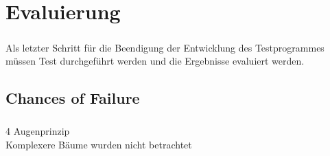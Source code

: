 \chapter{Evaluierung}\label{chp:Evaluierung}
\paragraph{}

Als letzter Schritt für die Beendigung der Entwicklung des Testprogrammes müssen Test durchgeführt werden und die Ergebnisse evaluiert werden.

\section{Chances of Failure}
\paragraph{}
4 Augenprinzip\\
Komplexere Bäume wurden nicht betrachtet